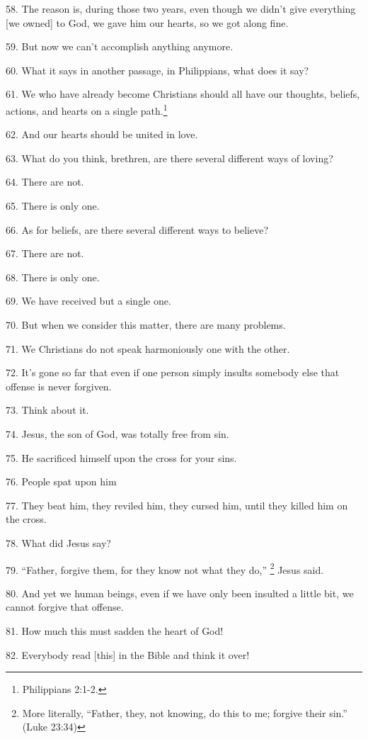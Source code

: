 58. The reason is, during those two years, even though we didn't give everything
[we owned] to God, we gave him our hearts, so we got along fine.

59. But now we can't accomplish anything anymore.

60. What it says in another passage, in Philippians, what does it say?

61. We who have already become Christians should all have our thoughts, beliefs,
actions, and hearts on a single path.\footnote{Philippians 2:1-2.}

62. And our hearts should be united in love.

63. What do you think, brethren, are there several different ways of loving?

64. There are not.

65. There is only one.

66. As for beliefs, are there several different ways to believe?

67. There are not.

68. There is only one.

69. We have received but a single one.

70. But when we consider this matter, there are many problems.

71. We Christians do not speak harmoniously one with the other.

72. It's gone so far that even if one person simply insults somebody else that
offense is never forgiven.

73. Think about it.

74. Jesus, the son of God, was totally free from sin.

75. He sacrificed himself upon the cross for your sins.

76. People spat upon him

77. They beat him, they reviled him, they cursed him, until they killed him on
the cross.

78. What did Jesus say?

79. ``Father, forgive them, for they know not what they do,'' \footnote{More literally, ``Father, they, not knowing, do this to me; forgive their sin.'' (Luke 23:34)} Jesus said.

80. And yet we human beings, even if we have only been insulted a little bit, we
cannot forgive that offense.

81. How much this must sadden the heart of God!

82. Everybody read [this] in the Bible and think it over!

